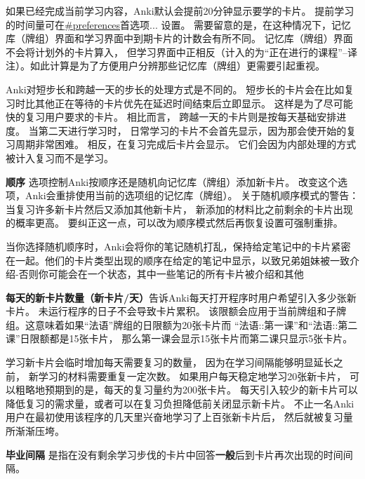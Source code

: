 \documentclass[a4paper]{book}
\begin{document}
\begin{shaded}
	如果已经完成当前学习内容，Anki默认会提前20分钟显示要学的卡片。 提前学习的时间量可在\url{#preferences}首选项... 设置。 需要留意的是，在这种情况下，记忆库（牌组）界面和学习界面中到期卡片的计数会有所不同。 记忆库（牌组）界面不会将计划外的卡片算入， 但学习界面中正相反（计入的为“正在进行的课程”--译注）。如此计算是为了方便用户分辨那些记忆库（牌组）更需要引起重视。
\end{shaded}

\begin{shaded}
	Anki对短步长和跨越一天的步长的处理方式是不同的。 短步长的卡片会在比如复习时比其他正在等待的卡片优先在延迟时间结束后立即显示。 这样是为了尽可能快的复习用户要求的卡片。 相比而言， 跨越一天的卡片则是按每天基础安排进度。 当第二天进行学习时， 日常学习的卡片不会首先显示，因为那会使开始的复习周期非常困难。 相反，在复习完成后卡片会显示。 它们会因为内部处理的方式被计入复习而不是学习。
\end{shaded}

\textbf{顺序} 选项控制Anki按顺序还是随机向记忆库（牌组）添加新卡片。 改变这个选项，Anki会重排使用当前的选项组的记忆库（牌组）。 关于随机顺序模式的警告： 当复习许多新卡片然后又添加其他新卡片， 新添加的材料比之前剩余的卡片出现的概率更高。 要纠正这一点，可以改为顺序模式然后再恢复设置可强制重排。

\begin{shaded}
	当你选择随机顺序时，Anki会将你的笔记随机打乱，保持给定笔记中的卡片紧密在一起。他们的卡片类型出现的顺序在给定的笔记中显示，以致兄弟姐妹被一致介绍-否则你可能会在一个状态，其中一些笔记的所有卡片被介绍和其他
\end{shaded}
\textbf{每天的新卡片数量（新卡片/天）}告诉Anki每天打开程序时用户希望引入多少张新卡片。 未运行程序的日子不会导致卡片累积。 该限额会应用于当前牌组和子牌组。这意味着如果“法语”牌组的日限额为20张卡片而 “法语::第一课”和“法语::第二课”日限额都是15张卡片， 那么第一课会显示15张卡片而第二课只显示5张卡片。

\begin{shaded}
	学习新卡片会临时增加每天需要复习的数量， 因为在学习间隔能够明显延长之前， 新学习的材料需要重复一定次数。 如果用户每天稳定地学习20张新卡片， 可以粗略地预期到的是，每天的复习量约为200张卡片。 每天引入较少的新卡片可以降低复习的需求量，或者可以在复习负担降低前关闭显示新卡片。 不止一名Anki用户在最初使用该程序的几天里兴奋地学习了上百张新卡片后， 然后就被复习量所渐渐压垮。
\end{shaded}

\textbf{毕业间隔} 是指在没有剩余学习步伐的卡片中回答\textbf{一般}后到卡片再次出现的时间间隔。
\end{document}

